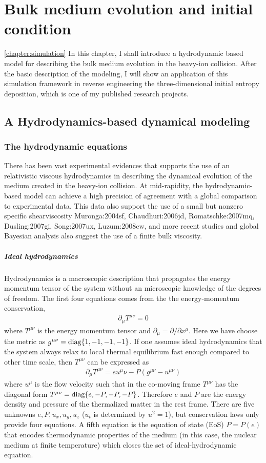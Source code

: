 \chapter{Bulk medium evolution and initial condition}
\ref{chapter:simulation}
In this chapter, I shall introduce a hydrodynamic based model for describing the bulk medium evolution in the heavy-ion collision.
After the basic description of the modeling, I will show an application of this simulation framework in reverse engineering the three-dimensional initial entropy deposition, which is one of my published research projects.

\section{A Hydrodynamics-based dynamical modeling}
\subsection{The hydrodynamic equations}
There has been vast experimental evidences that supports the use of an relativistic viscous hydrodynamics in describing the dynamical evolution of the medium created in the heavy-ion collision.
At mid-rapidity, the hydrodynamic-based model can achieve a high precision of agreement with a global comparison to experimental data. 
This data also support the use of a small but nonzero specific shearviscosity {Muronga:2004sf, Chaudhuri:2006jd, Romatschke:2007mq, Dusling:2007gi, Song:2007ux, Luzum:2008cw}, and more recent studies and global Bayesian analysis also suggest the use of a finite bulk viscosity.

\paragraph{Ideal hydrodynamics} Hydrodynamics is a macroscopic description that propagates the energy momentum tensor of the system without an microscopic knowledge of the degrees of freedom.
The first four equations comes from the the energy-momentum conservation,
\begin{eqnarray}
\partial_\mu T^{\mu\nu} = 0
\end{eqnarray}
where $T^{\mu\nu}$ is the energy momentum tensor and $\partial_\mu = \partial/\partial x^\mu$. 
Here we have choose the metric as $g^{\mu\nu} = \operatorname{diag}\{1, -1, -1, -1\}$.
If one assumes ideal hydrodynamics that the system always relax to local thermal equilibrium fast enough compared to other time scale, then $T^{\mu\nu}$ can be expressed as
\begin{eqnarray}
\partial_\mu T^{\mu\nu} = e u^\mu \nu - P (g^{\mu\nu}-u^{\mu\nu})
\end{eqnarray}
where $u^\mu$ is the flow velocity such that in the co-moving frame  $T^{\mu\nu}$ has the diagonal form $T^{\mu\nu} = \operatorname{diag}\{e, -P, -P, -P\}$.
Therefore $e$ and $P$ are the energy density and pressure of the thermalized matter in the rest frame.
There are five unknowns $e, P, u_x, u_y, u_z$ ($u_t$ is determined by $u^2 = 1$), but conservation laws only provide four equations.
A fifth equation is the equation of state (EoS) $P = P(e)$ that encodes thermodynamic properties of the medium (in this case, the nuclear medium at finite temperature) which closes the set of ideal-hydrodynamic equation.
